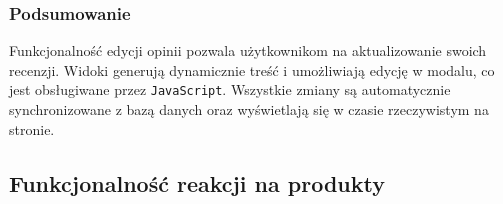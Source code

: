 \documentclass[12pt,a4paper,oneside]{article}
\theoremstyle{definition}
\numberwithin{equation}{section}
\begin{document}
\subsubsection{Podsumowanie}
Funkcjonalność edycji opinii pozwala użytkownikom na aktualizowanie swoich recenzji. Widoki generują dynamicznie treść i umożliwiają edycję w modalu, co jest obsługiwane przez \texttt{JavaScript}. Wszystkie zmiany są automatycznie synchronizowane z bazą danych oraz wyświetlają się w czasie rzeczywistym na stronie.



% 
% 
\clearpage
\subsection{Funkcjonalność reakcji na produkty}
\end{document}
